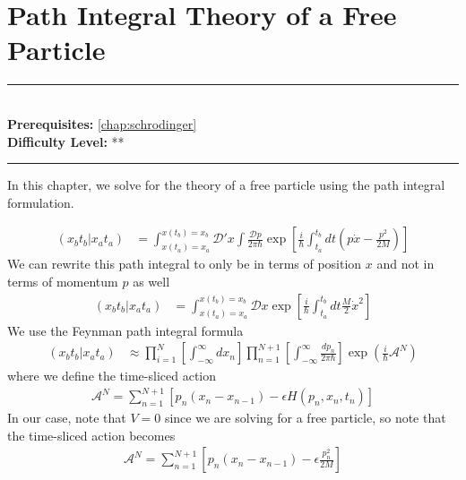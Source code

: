 \documentclass[book.tex]{subfiles}
\begin{document}
\chapter{Path Integral Theory of a Free Particle}

\label{chap:perturbation_theory}
\noindent\rule{11cm}{0.4pt} \\
\textbf{Prerequisites:} \autoref{chap:schrodinger} \\
\textbf{Difficulty Level:} ** \\
\noindent\rule{11cm}{0.4pt}
\vspace{5mm}


In this chapter, we solve for the theory of a free particle using the path integral formulation. 

\begin{align}
(x_bt_b|x_at_a) &= \int_{x(t_a)=x_a}^{x(t_b)=x_b}\mathcal{D}'x \int \frac{\mathcal{D}p}{2\pi\hbar} \exp \left [\frac{i}{\hbar} \int_{t_a}^{t_b} dt\left ( p \dot{x} - \frac{p^2}{2M} \right )\right]
\end{align}
We can rewrite this path integral to only be in terms of position $x$ and not in terms of momentum $p$ as well
\begin{align}
    (x_bt_b|x_at_a) &= \int_{x(t_a)=x_a}^{x(t_b)=x_b} \mathcal{D}x\exp \left [ \frac{i}{\hbar} \int_{t_a}^{t_b} dt\frac{M}{2}\dot{x}^2\right]
\end{align}
We use the Feynman path integral formula %
\begin{align}
    (x_bt_b|x_at_a) &\approx \prod_{i=1}^N \left [ \int_{-\infty}^\infty dx_n \right] \prod_{n=1}^{N+1} \left [ \int_{-\infty}^\infty \frac{dp_n}{2\pi\hbar} \right] \exp \left( \frac{i}{\hbar} \mathcal{A}^N\right)
\end{align}
where we define the time-sliced action
\begin{align}
\mathcal{A}^N = \sum_{n=1}^{N+1} [p_n(x_n-x_{n-1}) - \epsilon H(p_n,x_n, t_n)]
\end{align}
In our case, note that $V=0$ since we are solving for a free particle, so note that the time-sliced action becomes
\begin{align}
\mathcal{A}^N = \sum_{n=1}^{N+1} \left [ p_n(x_n - x_{n-1}) - \epsilon \frac{p_n^2}{2M} \right ]
\end{align}
\end{document}
